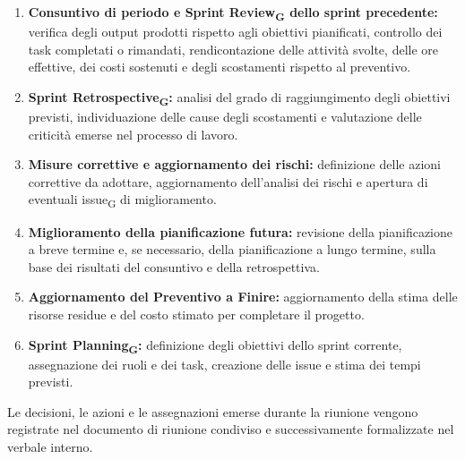 \begin{enumerate}
    \item \textbf{Consuntivo di periodo e Sprint Review\textsubscript{G} dello
    sprint precedente:} verifica degli output prodotti rispetto agli obiettivi
    pianificati, controllo dei task completati o rimandati, rendicontazione delle
    attività svolte, delle ore effettive, dei costi sostenuti e degli scostamenti
    rispetto al preventivo.

    \item \textbf{Sprint Retrospective\textsubscript{G}:} analisi del grado di
    raggiungimento degli obiettivi previsti, individuazione delle cause degli
    scostamenti e valutazione delle criticità emerse nel processo di lavoro.

    \item \textbf{Misure correttive e aggiornamento dei rischi:} definizione delle
    azioni correttive da adottare, aggiornamento dell'analisi dei rischi e apertura
    di eventuali issue\textsubscript{G} di miglioramento.

    \item \textbf{Miglioramento della pianificazione futura:} revisione della
    pianificazione a breve termine e, se necessario, della pianificazione a lungo
    termine, sulla base dei risultati del consuntivo e della retrospettiva.

    \item \textbf{Aggiornamento del Preventivo a Finire:} aggiornamento della stima
    delle risorse residue e del costo stimato per completare il progetto.

    \item \textbf{Sprint Planning\textsubscript{G}:} definizione degli obiettivi
    dello sprint corrente, assegnazione dei ruoli e dei task, creazione delle
    issue e stima dei tempi previsti.
\end{enumerate}

Le decisioni, le azioni e le assegnazioni emerse durante la riunione vengono
registrate nel documento di riunione condiviso e successivamente formalizzate
nel verbale interno.

